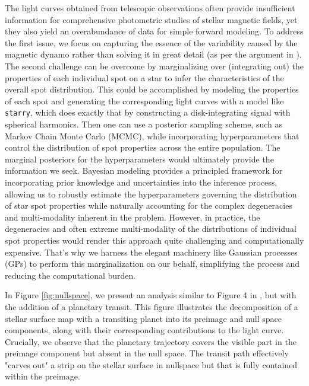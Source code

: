 \documentclass[twocolumn]{aastex631}
\begin{document}
The light curves obtained from telescopic observations often provide insufficient information for comprehensive photometric studies of stellar 
magnetic fields, yet they also yield an overabundance of data for simple forward modeling. To address the first issue, we focus on capturing the essence 
of the variability caused by the magnetic dynamo rather than solving it in great detail (as per the argument in \cite{Luger2021b}). The second challenge can 
be overcome by marginalizing over (integrating out) the properties of each individual spot on a star to infer the characteristics of the overall spot distribution. 
This could be accomplished by modeling the properties of each spot and generating 
the corresponding light curves with a model like \texttt{starry}, which does exactly that by constructing a disk-integrating signal 
with spherical harmonics. Then one can use a posterior sampling scheme, such as Markov Chain Monte Carlo (MCMC), 
while incorporating hyperparameters that control the distribution of spot properties across the entire population. The marginal posteriors for 
the hyperparameters would ultimately provide the information we seek. Bayesian modeling provides a principled framework for incorporating prior 
knowledge and uncertainties into the inference process, allowing us to robustly estimate the hyperparameters governing the distribution of star spot 
properties while naturally accounting for the complex degeneracies and multi-modality inherent in the problem.
However, in practice, the degeneracies and often extreme multi-modality of the distributions of individual spot properties would render this approach 
quite challenging and computationally expensive. That's why we harness the elegant machinery like Gaussian processes (GPs) to perform 
this marginalization on our behalf, simplifying the process and reducing the computational burden.

In Figure \ref{fig:nullspace}, we present an analysis similar to Figure 4 in \cite{Luger2021b}, but with the addition of a planetary transit. 
This figure illustrates the decomposition of a stellar surface map with a transiting planet into its preimage and null space components, 
along with their corresponding contributions to the light curve. Crucially, we observe that the planetary trajectory covers the visible part in the preimage 
component but absent in the null space. The transit path effectively "carves out" a strip on the stellar surface in nullspace but that is 
fully contained within the preimage.
\end{document}
